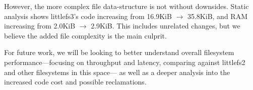 \documentclass[letterpaper,twocolumn,10pt]{article}
\def\lfs+{littlefs}
\def\lfsiii+{avianfs}
\def\lfsiii+{littlefs3}
\def\lfsii+{littlefs2}
\begin{document}
However, the more complex file data-structure is not without downsides.
Static analysis shows \lfsiii+'s code increasing from
16.9KiB {$\rightarrow$} 35.8KiB, and RAM increasing from
2.0KiB {$\rightarrow$} 2.9KiB.
This includes unrelated changes, but we believe the added file
complexity is the main culprit.

For future work, we will be looking to better understand overall
filesystem performance---focusing on throughput and latency, comparing 
against \lfsii+ and other filesystems in this space---%
as well as a deeper analysis into the increased code cost and possible
reclamations.



% 
% 
% 
% 
% 
% 
% 
% 
% 
% 
% 
% 
% 
% 
% 











\end{document}
